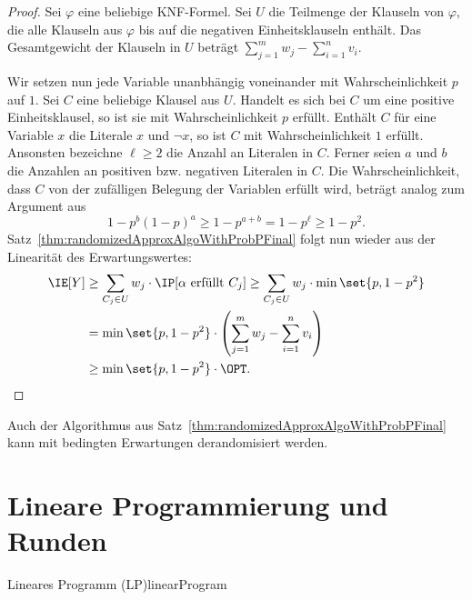 \documentclass[language=ngerman,algolist]{TemplateLecture}
\begin{document}
\begin{proof}
    Sei $\varphi$ eine beliebige KNF-Formel. Sei $U$ die Teilmenge der Klauseln von $\varphi$, die alle Klauseln aus $\varphi$ bis auf die negativen Einheitsklauseln enthält. Das Gesamtgewicht der Klauseln in $U$ beträgt $\sum_{j = 1}^m w_j - \sum_{i = 1}^n v_i$.

    Wir setzen nun jede Variable unanbhängig voneinander mit Wahrscheinlichkeit $p$ auf $1$. Sei $C$ eine beliebige Klausel aus $U$. Handelt es sich bei $C$ um eine positive Einheitsklausel, so ist sie mit Wahrscheinlichkeit $p$ erfüllt. Enthält $C$ für eine Variable $x$ die Literale $x$ und $\neg x$, so ist $C$ mit Wahrscheinlichkeit $1$ erfüllt. Ansonsten bezeichne $\ell \geq 2$ die Anzahl an Literalen in $C$. Ferner seien $a$ und $b$ die Anzahlen an positiven bzw. negativen Literalen in $C$. Die Wahrscheinlichkeit, dass $C$ von der zufälligen Belegung der Variablen erfüllt wird, beträgt analog zum Argument aus~ 
    \begin{equation*}
        1 - p^b(1-p)^a \geq 1 - p^{a+b} = 1 - p^\ell \geq 1 - p^2.
    \end{equation*}
    Satz~\ref{thm:randomizedApproxAlgoWithProbPFinal} folgt nun wieder aus der Linearität des Erwartungswertes:
    \begin{equation*}
        \begin{split}
            \IE[Y] &\geq \sum_{C_j \in U} w_j \cdot \IP[\text{$\alpha$ erfüllt $C_j$}] \geq \sum_{C_j \in U} w_j \cdot \min\set{p, 1-p^2} \\
            &= \min\set{p, 1-p^2} \cdot \left( \sum_{j = 1}^m w_j - \sum_{i = 1}^n v_i \right) \\
            &\geq \min\set{p, 1-p^2} \cdot \OPT.
        \end{split}
    \end{equation*}
\end{proof}
Auch der Algorithmus aus Satz~\ref{thm:randomizedApproxAlgoWithProbPFinal} kann mit bedingten Erwartungen derandomisiert werden.


\chapter{Lineare Programmierung und Runden}

\begin{prob}{Lineares Programm (LP)}{linearProgram}
\end{prob}
\end{document}

